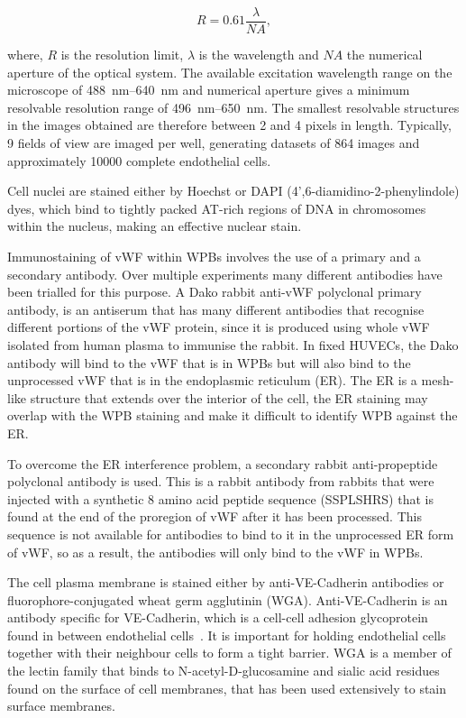 \begin{equation}
R=0.61\frac{\lambda}{NA},
\end{equation}

where, $R$ is the resolution limit, $\lambda$ is the wavelength and $NA$ the numerical aperture of the optical system. The available excitation wavelength range on the microscope of \SIrange{488}{640}{\nano\meter} and numerical aperture gives a minimum resolvable resolution range of \SIrange{496}{650}{\nano\meter}. The smallest resolvable structures in the images obtained are therefore between 2 and 4 pixels in length. Typically, 9 fields of view are imaged per well, generating datasets of 864 images and approximately 10000 complete endothelial cells.

Cell nuclei are stained either by Hoechst or DAPI (4',6-diamidino-2-phenylindole) dyes, which bind to tightly packed AT-rich regions of DNA in chromosomes within the nucleus, making an effective nuclear stain. 

Immunostaining of vWF within WPBs involves the use of a primary and a secondary antibody. Over multiple experiments many different antibodies have been trialled for this purpose. A Dako rabbit anti-vWF polyclonal primary antibody, is an antiserum that has many different antibodies that recognise different portions of the vWF protein, since it is produced using whole vWF isolated from human plasma to immunise the rabbit. In fixed HUVECs, the Dako antibody will bind to the vWF that is in WPBs but will also bind to the unprocessed vWF that is in the endoplasmic reticulum (ER). The ER is a mesh-like structure that extends over the interior of the cell, the ER staining may overlap with the WPB staining and make it difficult to identify WPB against the ER.

To overcome the ER interference problem, a secondary rabbit anti-propeptide polyclonal antibody is used. This is a rabbit antibody from rabbits that were injected with a synthetic 8 amino acid peptide sequence (SSPLSHRS) that is found at the end of the proregion of vWF after it has been processed. This sequence is not available for antibodies to bind to it in the unprocessed ER form of vWF, so as a result, the antibodies will only bind to the vWF in WPBs.

The cell plasma membrane is stained either by anti-VE-Cadherin antibodies or fluorophore-conjugated wheat germ agglutinin (WGA). Anti-VE-Cadherin is an antibody specific for VE-Cadherin, which is a cell-cell adhesion glycoprotein found in between endothelial cells~\cite{Vestweber2008}. It is important for holding endothelial cells together with their neighbour cells to form a tight barrier. WGA is a member of the lectin family that binds to N-acetyl-D-glucosamine and sialic acid residues found on the surface of cell membranes, that has been used extensively to stain surface membranes.


